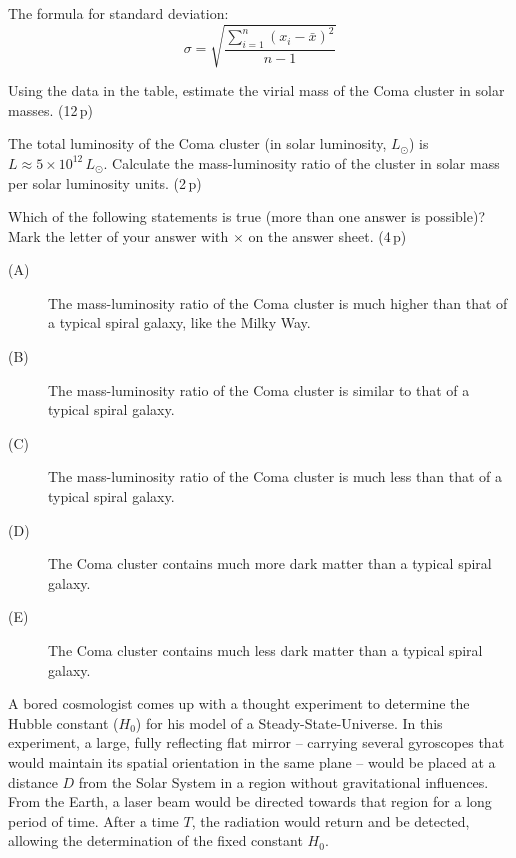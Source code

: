 \begin{description}
  The formula for standard deviation:
  \[ \sigma = \sqrt{\frac{\sum_{i=1}^{n}(x_i - \bar{x})^2}{n-1}} \]
\item[d)] Using the data in the table, estimate the virial mass of the Coma
  cluster in solar masses. \hfill(12\,p)
\item[e)] The total luminosity of the Coma cluster (in solar luminosity,
  $L_\odot$) is $L \approx 5 \times 10^{12}\,L_\odot$. Calculate the
  mass-luminosity ratio of the cluster in solar mass per solar luminosity
  units. \hfill(2\,p)
\item[f)] Which of the following statements is true (more than one answer is
  possible)? Mark the letter of your answer with $\times$ on the answer sheet.
  \hfill(4\,p)
  \begin{description}
  \item[(A)] The mass-luminosity ratio of the Coma cluster is much higher than
    that of a typical spiral galaxy, like the Milky Way.
  \item[(B)] The mass-luminosity ratio of the Coma cluster is similar to that
    of a typical spiral galaxy.
  \item[(C)] The mass-luminosity ratio of the Coma cluster is much less than
    that of a typical spiral galaxy.
  \item[(D)] The Coma cluster contains much more dark matter than a typical
    spiral galaxy.
  \item[(E)] The Coma cluster contains much less dark matter than a typical
    spiral galaxy.
  \end{description}
\end{description}

A bored cosmologist comes up with a thought experiment to determine the Hubble
constant ($H_0$) for his model of a Steady-State-Universe. In this experiment,
a large, fully reflecting flat mirror -- carrying several gyroscopes that
would maintain its spatial orientation in the same plane -- would be placed at
a distance $D$ from the Solar System in a region without gravitational
influences. From the Earth, a laser beam would be directed towards that region
for a long period of time. After a time $T$, the radiation would return and be
detected, allowing the determination of the fixed constant $H_0$.

